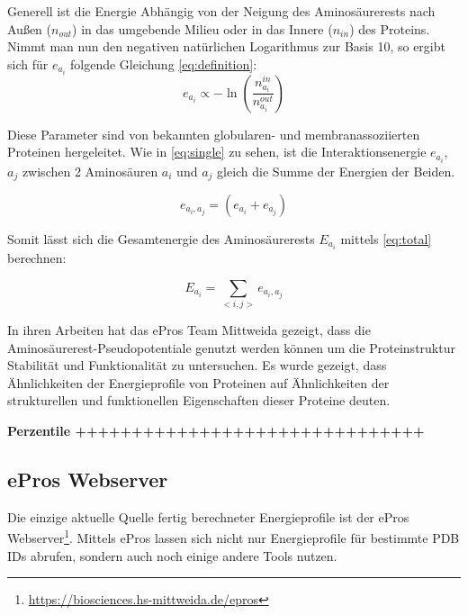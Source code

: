 Generell ist die Energie Abhängig von der Neigung des Aminosäurerests nach Außen ($n_{out}$) in das umgebende Milieu oder in das Innere ($n_{in}$) des Proteins. Nimmt man nun den negativen natürlichen Logarithmus zur Basis 10, so ergibt sich für $e_{a_i}$ folgende Gleichung \ref{eq:definition}:
%
\begin{equation}
  	e_{a_i} \propto -\ln{\left(\frac{n_{a_i}^{in}}{n_{a_i}^{out}}\right)}
  	\label{eq:definition}
\end{equation}

Diese Parameter sind von bekannten globularen- und membranassoziierten Proteinen hergeleitet. Wie in \ref{eq:single} zu sehen, ist die Interaktionsenergie $e_{a_{i}}$, $a_{j}$ zwischen 2 Aminosäuren $a_{i}$ und $a_{j}$ gleich die Summe der Energien der Beiden. 

\begin{equation}
  	e_{a_{i},a_{j}} = \left( e_{a_{i}} + e_{a_{j}} \right)
    \label{eq:single}
\end{equation}

Somit lässt sich die Gesamtenergie des Aminosäurerests $E_{a_i}$ mittels \ref{eq:total} berechnen:

\begin{equation}
    E_{a_{i}} = \sum_{< i, j >}{e_{a_{i},a_{j}}}
    \label{eq:total}
\end{equation}

In ihren Arbeiten \cite{Heinke.2011} hat das ePros Team Mittweida gezeigt, dass die Aminosäurerest-Pseudopotentiale genutzt werden können um die Proteinstruktur Stabilität und Funktionalität zu untersuchen. Es wurde gezeigt, dass Ähnlichkeiten der Energieprofile von Proteinen auf Ähnlichkeiten der strukturellen und funktionellen Eigenschaften dieser Proteine deuten.

\textbf{Perzentile +++++++++++++++++++++++++++++++}

\subsection{ePros Webserver}
\label{sec:epros}
Die einzige aktuelle Quelle fertig berechneter Energieprofile ist der ePros Webserver\footnote{\url{https://biosciences.hs-mittweida.de/epros}}. Mittels ePros lassen sich nicht nur Energieprofile für bestimmte PDB IDs abrufen, sondern auch noch einige andere Tools nutzen.

